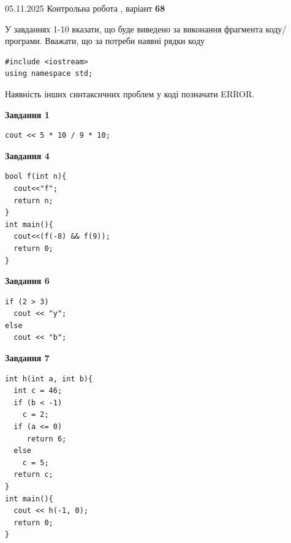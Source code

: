\documentclass[12pt, ukrainian]{article}
\begin{document}
{\Large{05.11.2025 Контрольна робота , варіант  \No \textbf { 68 }\par}}
{
\begin {large}
У завданнях 1-10 вказати, що буде виведено за виконання фрагмента коду/про\-гра\-ми.
Вважати, що за потреби наявні рядки коду
\begin{verbatim}
#include <iostream>
using namespace std;
\end{verbatim}
Наявність інших синтаксичних проблем у коді позначати ERROR.

\begin{minipage}[t]{7.0cm}

\begin{center}
\textbf{Завдання 1}
\end{center}
\vspace{-8mm}

\begin{verbatim}
cout << 5 * 10 / 9 * 10;
\end{verbatim}



\begin{center}
\textbf{Завдання 4}
\end{center}
\vspace{-8mm}

\begin{verbatim}
bool f(int n){
  cout<<"f";
  return n;
}
int main(){
  cout<<(f(-8) && f(9));
  return 0;
}
\end{verbatim}



\begin{center}
\textbf{Завдання 6}
\end{center}
\vspace{-8mm}

\begin{verbatim}
if (2 > 3)
  cout << "y";
else
  cout << "b";
\end{verbatim}



\begin{center}
\textbf{Завдання 7}
\end{center}
\vspace{-8mm}

\begin{verbatim}
int h(int a, int b){
  int c = 46;
  if (b < -1)
    c = 2;
  if (a <= 0)
     return 6;
  else
    c = 5;
  return c;
}
int main(){
  cout << h(-1, 0);
  return 0;
}
\end{verbatim}


\end{minipage}
\end{large}}
\end{document}
